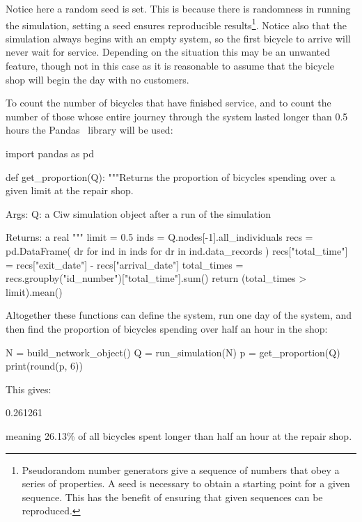 Notice here a random seed is set. This is because there is randomness in running
the simulation, setting a seed ensures reproducible results\footnote{
Pseudorandom number generators give a sequence of numbers that obey a series of
properties. A seed is necessary to obtain a starting point for a given sequence.
This has the benefit of ensuring that given sequences can be reproduced.
}.
Notice also that the simulation always begins with an empty system, so the first
bicycle to arrive will never wait for service. Depending on the situation this
may be an unwanted feature, though not in this case as it is reasonable to
assume that the bicycle shop will begin the day with no customers.

To count the number of bicycles that have finished service, and to
count the number of those whose entire journey through the system lasted longer
than 0.5 hours the Pandas~\cite{reback2020pandas, mckinney-proc-scipy-2010}
library will be used:

\begin{pyin}
import pandas as pd


def get_proportion(Q):
    """Returns the proportion of bicycles spending over a given
    limit at the repair shop.

    Args:
        Q: a Ciw simulation object after a run of the
           simulation

    Returns:
        a real
    """
    limit = 0.5
    inds = Q.nodes[-1].all_individuals
    recs = pd.DataFrame(
        dr for ind in inds for dr in ind.data_records
    )
    recs["total_time"] = recs["exit_date"] - recs["arrival_date"]
    total_times = recs.groupby("id_number")["total_time"].sum()
    return (total_times > limit).mean()
\end{pyin}

Altogether these functions can define the system, run one day of the system, and
then find the proportion of bicycles spending over half an hour in the shop:

\begin{pyin}
N = build_network_object()
Q = run_simulation(N)
p = get_proportion(Q)
print(round(p, 6))
\end{pyin}

This gives:

\begin{pyout}
0.261261
\end{pyout}

meaning 26.13\% of all bicycles spent longer than half an hour at the repair
shop.

